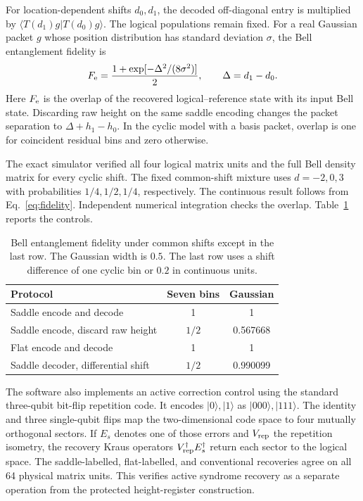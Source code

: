 \documentclass[aip,adv,reprint,floatfix]{revtex4-2}
\begin{document}
For location-dependent shifts \(d_0,d_1\), the decoded off-diagonal entry is multiplied by \(\langle T(d_1)g|T(d_0)g\rangle\). The logical populations remain fixed. For a real Gaussian packet \(g\) whose position distribution has standard deviation \(\sigma\), the Bell entanglement fidelity is
\begin{equation}
F_{\rm e}=\frac{1+\exp[-\Delta^2/(8\sigma^2)]}{2},
\qquad \Delta=d_1-d_0.
\label{eq:fidelity}
\end{equation}
Here \(F_{\rm e}\) is the overlap of the recovered logical--reference state with its input Bell state. Discarding raw height on the same saddle encoding changes the packet separation to \(\Delta+h_1-h_0\). In the cyclic model with a basis packet, overlap is one for coincident residual bins and zero otherwise.

The exact simulator verified all four logical matrix units and the full Bell density matrix for every cyclic shift. The fixed common-shift mixture uses \(d=-2,0,3\) with probabilities \(1/4,1/2,1/4\), respectively. The continuous result follows from Eq.~\eqref{eq:fidelity}. Independent numerical integration checks the overlap. Table~\ref{tab:controls} reports the controls.

\begin{table}[ht]
\caption{Bell entanglement fidelity under common shifts except in the last row. The Gaussian width is \(0.5\). The last row uses a shift difference of one cyclic bin or \(0.2\) in continuous units.}
\label{tab:controls}
\begin{ruledtabular}
\begin{tabular}{lcc}
Protocol & Seven bins & Gaussian\\
\hline
Saddle encode and decode & 1 & 1\\
Saddle encode, discard raw height & \(1/2\) & 0.567668\\
Flat encode and decode & 1 & 1\\
Saddle decoder, differential shift & \(1/2\) & 0.990099\\
\end{tabular}
\end{ruledtabular}
\end{table}

The software also implements an active correction control using the standard three-qubit bit-flip repetition code. It encodes \(|0\rangle,|1\rangle\) as \(|000\rangle,|111\rangle\). The identity and three single-qubit flips map the two-dimensional code space to four mutually orthogonal sectors. If \(E_s\) denotes one of those errors and \(V_{\rm rep}\) the repetition isometry, the recovery Kraus operators \(V_{\rm rep}^\dagger E_s^\dagger\) return each sector to the logical space. The saddle-labelled, flat-labelled, and conventional recoveries agree on all 64 physical matrix units. This verifies active syndrome recovery as a separate operation from the protected height-register construction.
\end{document}

